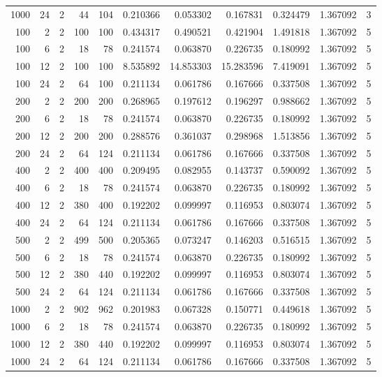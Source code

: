\begin{table}
\begin{tabular}{rrrrrrrrrrr}
1000 & 24 & 2 & 44 & 104 & 0.210366 & 0.053302 & 0.167831 & 0.324479 & 1.367092 & 3 \\
100 & 2 & 2 & 100 & 100 & 0.434317 & 0.490521 & 0.421904 & 1.491818 & 1.367092 & 5 \\
100 & 6 & 2 & 18 & 78 & 0.241574 & 0.063870 & 0.226735 & 0.180992 & 1.367092 & 5 \\
100 & 12 & 2 & 100 & 100 & 8.535892 & 14.853303 & 15.283596 & 7.419091 & 1.367092 & 5 \\
100 & 24 & 2 & 64 & 100 & 0.211134 & 0.061786 & 0.167666 & 0.337508 & 1.367092 & 5 \\
200 & 2 & 2 & 200 & 200 & 0.268965 & 0.197612 & 0.196297 & 0.988662 & 1.367092 & 5 \\
200 & 6 & 2 & 18 & 78 & 0.241574 & 0.063870 & 0.226735 & 0.180992 & 1.367092 & 5 \\
200 & 12 & 2 & 200 & 200 & 0.288576 & 0.361037 & 0.298968 & 1.513856 & 1.367092 & 5 \\
200 & 24 & 2 & 64 & 124 & 0.211134 & 0.061786 & 0.167666 & 0.337508 & 1.367092 & 5 \\
400 & 2 & 2 & 400 & 400 & 0.209495 & 0.082955 & 0.143737 & 0.590092 & 1.367092 & 5 \\
400 & 6 & 2 & 18 & 78 & 0.241574 & 0.063870 & 0.226735 & 0.180992 & 1.367092 & 5 \\
400 & 12 & 2 & 380 & 400 & 0.192202 & 0.099997 & 0.116953 & 0.803074 & 1.367092 & 5 \\
400 & 24 & 2 & 64 & 124 & 0.211134 & 0.061786 & 0.167666 & 0.337508 & 1.367092 & 5 \\
500 & 2 & 2 & 499 & 500 & 0.205365 & 0.073247 & 0.146203 & 0.516515 & 1.367092 & 5 \\
500 & 6 & 2 & 18 & 78 & 0.241574 & 0.063870 & 0.226735 & 0.180992 & 1.367092 & 5 \\
500 & 12 & 2 & 380 & 440 & 0.192202 & 0.099997 & 0.116953 & 0.803074 & 1.367092 & 5 \\
500 & 24 & 2 & 64 & 124 & 0.211134 & 0.061786 & 0.167666 & 0.337508 & 1.367092 & 5 \\
1000 & 2 & 2 & 902 & 962 & 0.201983 & 0.067328 & 0.150771 & 0.449618 & 1.367092 & 5 \\
1000 & 6 & 2 & 18 & 78 & 0.241574 & 0.063870 & 0.226735 & 0.180992 & 1.367092 & 5 \\
1000 & 12 & 2 & 380 & 440 & 0.192202 & 0.099997 & 0.116953 & 0.803074 & 1.367092 & 5 \\
1000 & 24 & 2 & 64 & 124 & 0.211134 & 0.061786 & 0.167666 & 0.337508 & 1.367092 & 5 \\

\end{tabular}
\end{table}
